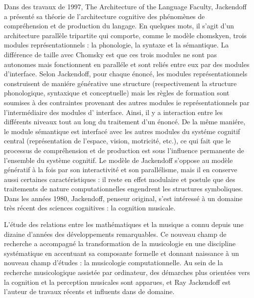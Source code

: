  Dans des travaux de 1997, The Architecture of the Language Faculty, Jackendoff a présenté sa théorie de l’architecture cognitive des phénomènes de compréhension et de production du langage. En quelques mots, il s’agit d’un architecture parallèle tripartite qui comporte, comme le modèle chomskyen, trois modules représentationnels : la phonologie, la syntaxe et la sémantique. La différence de taille avec Chomsky est que ces trois modules ne sont pas autonomes mais fonctionnent en paralléle et sont reliés entre eux par des modules d’interface. Selon Jackendoff, pour chaque énoncé, les modules représentationnels construisent de maniére générative une structure (respectivement la structure phonologique, syntaxique et conceptuelle) mais les règles de formation sont soumises à des contraintes provenant des autres modules ie représentationnels par l’intermédiaire des modules d’ interface. Ainsi, il y a interaction entre les différents niveaux tout au long du traitement d’un énoncé. De la même maniére, le module sémantique est interfacé avec les autres modules du systéme cognitif central (représentation de l’espace, vision, motricité, etc.), ce qui fait que le processus de compréhension et de production est sous l'influence permanente de l’ensemble du système cognitif. Le modèle de Jackendoff s’oppose au modèle génératif à la fois par son interactivité et son parallélisme, mais il en conserve aussi certaines caractéristiques : il reste en effet modulaire et postule que des traitements de nature computationnelles engendrent les structures symboliques. Dans les années 1980, Jackendoff, penseur original, s’est intéressé à un domaine très récent des sciences cognitives : la cognition musicale.\par


\par

L'étude des relations entre les mathématiques et la musique a connu depuis une dizaine d’années des développements remarquables. Ce nouveau champ de recherche a accompagné la transformation de la musicologie en une discipline systématique en accentuant sa composante formelle et donnant naissance à un nouveau champ d’études : la musicologie computationnelle. Au sein de la recherche musicologique assistée par ordinateur, des démarches plus orientées vers la cognition et la perception musicales sont apparues, et Ray Jackendoff est l’auteur de travaux récents et influents dans de domaine.\par

